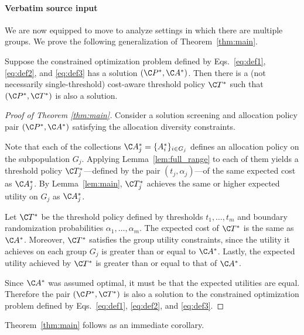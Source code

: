 \documentclass[10pt]{article}
\begin{document}
\paragraph{Verbatim source input}
\begin{ReviewVerbatim}
We are now equipped to move to analyze settings in which there are multiple groups. We prove the following generalization of Theorem~\ref{thm:main}.

\begin{thm}
     Suppose the constrained optimization problem defined by Eqs.~\eqref{eq:def1}, \eqref{eq:def2}, and \eqref{eq:def3} has a solution \((\C P^*, \C A^*)\).
     Then there is a (not necessarily single-threshold) cost-aware threshold policy \(\C T^*\) such that \((\C P^*, \C T^*)\) is also a solution.
\end{thm}

\begin{proof}[Proof of Theorem \ref{thm:main}]
    Consider a solution screening and allocation policy pair \((\C P^*, \C A^*)\) satisfying the allocation diversity constraints.

    Note that each of the collections \(\C A_j^* = \{A_i^*\}_{i \in G_j}\) defines an allocation policy on the subpopulation \(G_j\).
    Applying Lemma~\ref{lem:full_range} to each of them yields a threshold policy \(\C T_j^*\)---defined by the pair \((t_j, \alpha_j)\)---of the same expected cost as \(\C A_j^*\).
    By Lemma~\ref{lem:main}, \(\C T_j^*\) achieves the same or higher expected utility on \(G_j\) as \(\C A_j^*\).

    Let \(\C T^*\) be the threshold policy defined by thresholds \(t_1, \ldots, t_m\) and boundary randomization probabilities \(\alpha_1, \ldots, \alpha_m\).
    The expected cost of \(\C T^*\) is the same as \(\C A^*\).
    Moreover, \(\C T^*\) satisfies the group utility constraints, since the utility it achieves on each group \(G_j\) is greater than or equal to \(\C A^*\).
    Lastly, the expected utility achieved by \(\C T^*\) is greater than or equal to that of \(\C A^*\).

    Since \(\C A^*\) was assumed optimal, it must be that the expected utilities are equal. Therefore the pair \((\C P^*, \C T^*)\) is also a solution to the constrained optimization problem defined by Eqs.~\eqref{eq:def1}, \eqref{eq:def2}, and \eqref{eq:def3}.
\end{proof}

Theorem~\ref{thm:main} follows as an immediate corollary.


\end{ReviewVerbatim}
\end{document}
